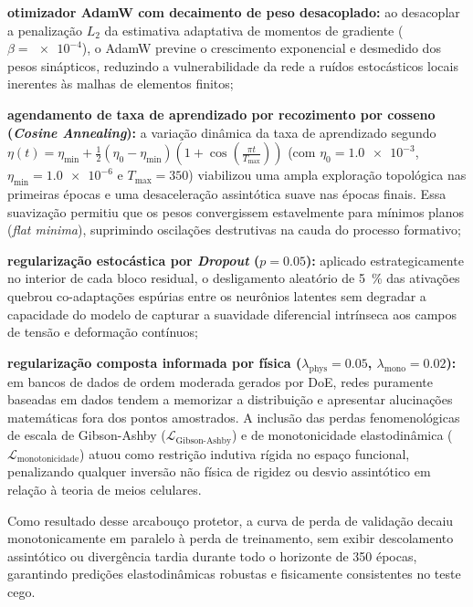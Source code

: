 \begin{alineas}
  \item \textbf{otimizador AdamW com decaimento de peso desacoplado:} ao desacoplar a penalização $L_2$ da estimativa adaptativa de momentos de gradiente ($\beta = \num{e-4}$), o AdamW previne o crescimento exponencial e desmedido dos pesos sinápticos, reduzindo a vulnerabilidade da rede a ruídos estocásticos locais inerentes às malhas de elementos finitos;
  \item \textbf{agendamento de taxa de aprendizado por recozimento por cosseno (\textit{Cosine Annealing}):} a variação dinâmica da taxa de aprendizado segundo $\eta(t) = \eta_{\min} + \frac{1}{2}(\eta_0 - \eta_{\min})\left(1 + \cos\left(\frac{\pi t}{T_{\max}}\right)\right)$ (com $\eta_0 = \num{1.0e-3}$, $\eta_{\min} = \num{1.0e-6}$ e $T_{\max} = 350$) viabilizou uma ampla exploração topológica nas primeiras épocas e uma desaceleração assintótica suave nas épocas finais. Essa suavização permitiu que os pesos convergissem estavelmente para mínimos planos (\textit{flat minima}), suprimindo oscilações destrutivas na cauda do processo formativo;
  \item \textbf{regularização estocástica por \textit{Dropout} ($p = \num{0.05}$):} aplicado estrategicamente no interior de cada bloco residual, o desligamento aleatório de \SI{5}{\percent} das ativações quebrou co-adaptações espúrias entre os neurônios latentes sem degradar a capacidade do modelo de capturar a suavidade diferencial intrínseca aos campos de tensão e deformação contínuos;
  \item \textbf{regularização composta informada por física ($\lambda_{\text{phys}} = \num{0.05}$, $\lambda_{\text{mono}} = \num{0.02}$):} em bancos de dados de ordem moderada gerados por DoE, redes puramente baseadas em dados tendem a memorizar a distribuição e apresentar alucinações matemáticas fora dos pontos amostrados. A inclusão das perdas fenomenológicas de escala de Gibson-Ashby ($\mathcal{L}_{\text{Gibson-Ashby}}$) e de monotonicidade elastodinâmica ($\mathcal{L}_{\text{monotonicidade}}$) atuou como restrição indutiva rígida no espaço funcional, penalizando qualquer inversão não física de rigidez ou desvio assintótico em relação à teoria de meios celulares.
\end{alineas}
Como resultado desse arcabouço protetor, a curva de perda de validação decaiu monotonicamente em paralelo à perda de treinamento, sem exibir descolamento assintótico ou divergência tardia durante todo o horizonte de 350 épocas, garantindo predições elastodinâmicas robustas e fisicamente consistentes no teste cego.

